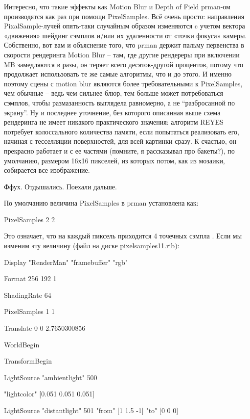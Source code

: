  Интересно, что такие эффекты как Motion Blur и
    Depth of Field prman-ом производятся как раз при помощи
    PixelSamples. Всё очень просто: направления PixalSample-лучей
    опять-таки случайным образом изменяются c учетом вектора «движения»
    шейдинг сэмплов и/или их удаленности от «точки фокуса» камеры.
    Собственно, вот вам и объяснение того, что prman держит пальму
    первенства в скорости рендеринга Motion Blur – там, где
    другие рендереры при включении MB замедляются в
    разы, он теряет всего десяток-другой процентов, потому что
    продолжает использовать те же самые алгоритмы, что и до этого. И
    именно поэтому сцены с motion blur являются
    более  требовательными к PixelSamples, чем
    обычные – ведь чем сильнее блюр, тем больше может потребоваться
    сэмплов, чтобы размазанность выглядела равномерно, а не
    “разбросанной по экрану”.\hfil\break
    Ну и последнее уточнение, без которого описанная выше схема
    рендеринга не имеет никакого практического значения: алгоритм REYES
    потребует колоссального количества памяти, если попытаться
    реализовать его, начиная с тесселляции поверхностей, для всей
    картинки сразу. К счастью, он прекрасно работает и с ее частями
    (помните, я рассказывал про бакеты?), по умолчанию, размером 16х16
    пикселей, из которых потом, как из мозаики, собирается все
    изображение.
  

 Ффух. Отдышались. Поехали дальше.
  

 По умолчанию величина PixelSamples в prman
    установлена как:
  

PixelSamples 2
    2
  

 Это означает, что на каждый пиксель приходится 4
    точечных сэмпла . Если мы изменим эту величину (файл на диске
    pixelsamples11.rib):
  

Display "RenderMan"
    "framebuffer" "rgb"
  

Format 256 192 1
  

ShadingRate 64
  

PixelSamples 1 1
  

Translate 0 0
    2.7650300856
  

WorldBegin
  

  TransformBegin
  

    LightSource
    "ambientlight" 500
  

                "lightcolor" [0.051 0.051 0.051]
  

    LightSource
    "distantlight" 501 "from" [1 1.5 -1] "to" [0 0 0]
  


